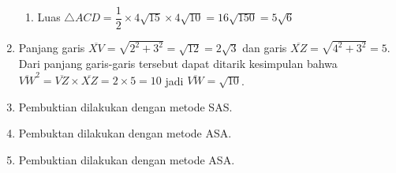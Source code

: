 \documentclass[12pt,a4paper]{article}
\begin{document}
\begin{enumerate}
\begin{enumerate}
			\item Luas $\triangle ACD=\dfrac{1}{2} \times 4\sqrt{15} \times 4\sqrt{10}=16\sqrt{150}= 5\sqrt{6}$
		\end{enumerate}
		\item Panjang garis $\overline{XV}=\sqrt{2^2+3^2}=\sqrt{12}=2\sqrt{3}$ dan garis $\overline{XZ}=\sqrt{4^2+3^2}=5$. Dari panjang garis-garis tersebut dapat ditarik kesimpulan bahwa $\overline{VW}^2=\overline{VZ}\times \overline{XZ}=2\times 5=10$ jadi $\overline{VW}=\sqrt{10}$.
		\item Pembuktian dilakukan dengan metode SAS.
		\item Pembuktan dilakukan dengan metode ASA.
		\item Pembuktian dilakukan dengan metode ASA. 
	\end{enumerate} 
\end{document}
